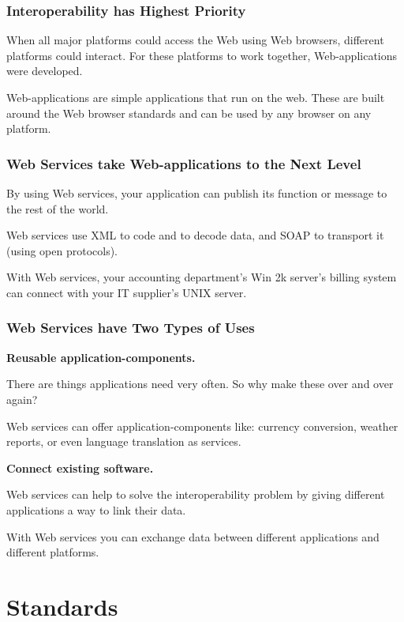 \documentclass[12pt,a4paper]{article}
\begin{document}
\subsubsection{Interoperability has Highest Priority}

When all major platforms could access the Web using Web browsers, different platforms could interact. For these platforms to work together, Web-applications were developed.

Web-applications are simple applications that run on the web. These are built around the Web browser standards and can be used by any browser on any platform.

\subsubsection{Web Services take Web-applications to the Next Level}

By using Web services, your application can publish its function or message to the rest of the world.

Web services use XML to code and to decode data, and SOAP to transport it (using open protocols).

With Web services, your accounting department's Win 2k server's billing system can connect with your IT supplier's UNIX server.

\subsubsection{Web Services have Two Types of Uses}

\bf{Reusable application-components.}

There are things applications need very often. So why make these over and over again?

Web services can offer application-components like: currency conversion, weather reports, or even language translation as services.

\bf{Connect existing software.}

Web services can help to solve the interoperability problem by giving different applications a way to link their data.

With Web services you can exchange data between different applications and different platforms.



\section{Standards}
\end{document}
